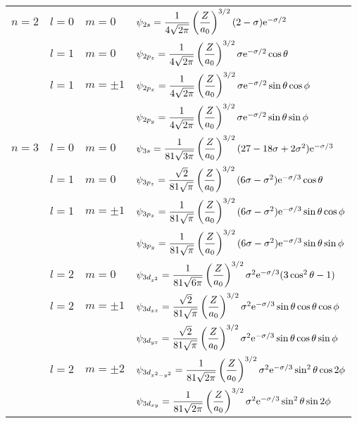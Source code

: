\documentclass[../notes.tex]{subfiles}
\begin{document}
\begin{itemize}
\begin{table}[h!]
\begin{tabular}{llll}
            $n=2$ & $l=0$ & $m=0$ & $\psi_{2s}=\dfrac{1}{4\sqrt{2\pi}}\left( \dfrac{Z}{a_0} \right)^{3/2}(2-\sigma)\e[-\sigma/2]$\\
                  & $l=1$ & $m=0$ & $\psi_{2p_z}=\dfrac{1}{4\sqrt{2\pi}}\left( \dfrac{Z}{a_0} \right)^{3/2}\sigma\e[-\sigma/2]\cos\theta$\\
                  & $l=1$ & $m=\pm 1$ & $\psi_{2p_x}=\dfrac{1}{4\sqrt{2\pi}}\left( \dfrac{Z}{a_0} \right)^{3/2}\sigma\e[-\sigma/2]\sin\theta\cos\phi$\\
                  &       &           & $\psi_{2p_y}=\dfrac{1}{4\sqrt{2\pi}}\left( \dfrac{Z}{a_0} \right)^{3/2}\sigma\e[-\sigma/2]\sin\theta\sin\phi$\\
            $n=3$ & $l=0$ & $m=0$ & $\psi_{3s}=\dfrac{1}{81\sqrt{3\pi}}\left( \dfrac{Z}{a_0} \right)^{3/2}(27-18\sigma+2\sigma^2)\e[-\sigma/3]$\\
                  & $l=1$ & $m=0$ & $\psi_{3p_z}=\dfrac{\sqrt{2}}{81\sqrt{\pi}}\left( \dfrac{Z}{a_0} \right)^{3/2}(6\sigma-\sigma^2)\e[-\sigma/3]\cos\theta$\\
                  & $l=1$ & $m=\pm 1$ & $\psi_{3p_x}=\dfrac{1}{81\sqrt{\pi}}\left( \dfrac{Z}{a_0} \right)^{3/2}(6\sigma-\sigma^2)\e[-\sigma/3]\sin\theta\cos\phi$\\
                  &       &           & $\psi_{3p_y}=\dfrac{1}{81\sqrt{\pi}}\left( \dfrac{Z}{a_0} \right)^{3/2}(6\sigma-\sigma^2)\e[-\sigma/3]\sin\theta\sin\phi$\\
                  & $l=2$ & $m=0$ & $\psi_{3d_{z^2}}=\dfrac{1}{81\sqrt{6\pi}}\left( \dfrac{Z}{a_0} \right)^{3/2}\sigma^2\e[-\sigma/3](3\cos^2\theta-1)$\\
                  & $l=2$ & $m=\pm 1$ & $\psi_{3d_{xz}}=\dfrac{\sqrt{2}}{81\sqrt{\pi}}\left( \dfrac{Z}{a_0} \right)^{3/2}\sigma^2\e[-\sigma/3]\sin\theta\cos\theta\cos\phi$\\
                  &       &           & $\psi_{3d_{yz}}=\dfrac{\sqrt{2}}{81\sqrt{\pi}}\left( \dfrac{Z}{a_0} \right)^{3/2}\sigma^2\e[-\sigma/3]\sin\theta\cos\theta\sin\phi$\\
                  & $l=2$ & $m=\pm 2$ & $\psi_{3d_{x^2-y^2}}=\dfrac{1}{81\sqrt{2\pi}}\left( \dfrac{Z}{a_0} \right)^{3/2}\sigma^2\e[-\sigma/3]\sin^2\theta\cos 2\phi$\\
                  &       &           & $\psi_{3d_{xy}}=\dfrac{1}{81\sqrt{2\pi}}\left( \dfrac{Z}{a_0} \right)^{3/2}\sigma^2\e[-\sigma/3]\sin^2\theta\sin 2\phi$\\
            \bottomrule
        \end{tabular}

\end{table}
\end{itemize}
\end{document}
